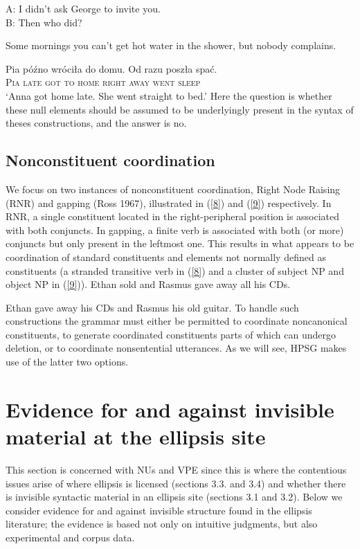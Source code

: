 \documentclass[output=paper
                ,modfonts
                ,nonflat
	        ,collection
	        ,collectionchapter
	        ,collectiontoclongg
 	        ,biblatex
                ,babelshorthands
                ,newtxmath
                ,draftmode
                ,colorlinks, citecolor=brown
]{./langsci/langscibook}
\begin{document}
{\ea A: I didn't ask George to invite you.\\B: Then who did?\label{5}\z

\ea Some mornings you can't get hot water in the shower, but nobody complains. \label{6} \z

\ea
\gll Pia p\'{o}\'{z}no wr\'{o}ci\l a do domu. {Od razu} posz\l a spa\'{c}.\\
\textsc{Pia} \textsc{late} \textsc{got} \textsc{to} \textsc{home} \textsc{right away} \textsc{went} \textsc{sleep}\\
\glt `Anna got home late. She went straight to bed.'
\label{7}
\z
Here the question is whether these null elements should be assumed to be underlyingly present in the syntax of theses constructions, and the answer is no.

\subsection{Nonconstituent coordination}
We focus on two instances of nonconstituent coordination, Right Node Raising (RNR) and gapping (Ross 1967), illustrated in (\ref{8}) and (\ref{9}) respectively. In RNR, a single constituent located in the right-peripheral position is associated with both conjuncts. In gapping, a finite verb is associated with both (or more) conjuncts but only present in the leftmost one. This results in what appears to be coordination of standard constituents and elements not normally defined as constituents (a stranded transitive verb in (\ref{8}) and a cluster of subject NP and object NP in (\ref{9})).
 \ea Ethan sold and Rasmus gave away all his CDs. \label{8}\z

 \ea Ethan gave away his CDs and Rasmus his old guitar. \label{9}\z
 To handle such constructions the grammar must either be permitted to coordinate noncanonical constituents, to generate coordinated constituents parts of which can undergo deletion, or to coordinate nonsentential utterances. As we will see, HPSG makes use of the latter two options.

\section{Evidence for and against invisible material at the ellipsis site}
This section is concerned with NUs and VPE since this is where the contentious issues arise of where ellipsis is licensed (sections 3.3. and 3.4) and whether there is invisible syntactic material in an ellipsis site (sections 3.1 and 3.2). Below we consider evidence for and against invisible structure found in the ellipsis literature; the evidence is based not only on intuitive judgments, but also experimental and corpus data.

}
\end{document}
